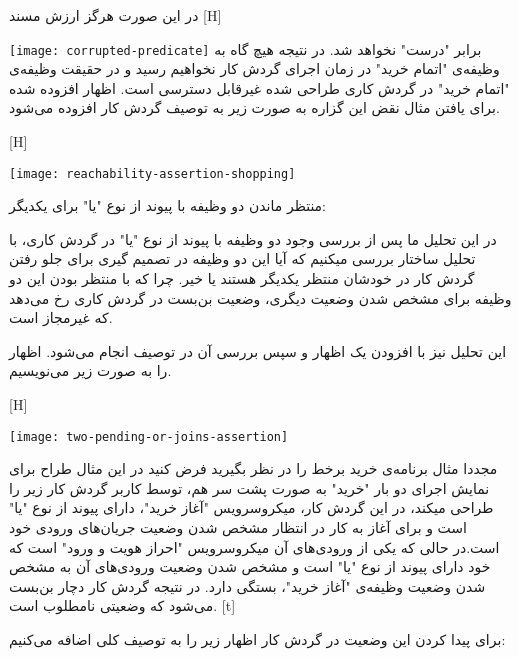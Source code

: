 در این صورت هرگز ارزش مسند 
[H]
\raggedright
\texttt{[image: corrupted-predicate]}
\vspace{0.5em}
برابر "درست" نخواهد شد. در نتیجه هیچ گاه به وظیفه‌ی "اتمام خرید" در زمان اجرای گردش کار نخواهیم رسید و در حقیقت وظیفه‌ی "اتمام خرید" در گردش کاری طراحی شده غیرقابل دسترسی است. اظهار افزوده شده برای یافتن مثال نقض این گزاره به صورت زیر به توصیف گردش کار افزوده می‌شود. 



[H]
\raggedright
\texttt{[image: reachability-assertion-shopping]}
\vspace{0.5em}
 

 منتظر ماندن دو وظیفه با پیوند از نوع "یا" برای یکدیگر:

در این تحلیل ما پس از بررسی وجود دو وظیفه با پیوند از نوع "یا" در گردش کاری، با تحلیل ساختار بررسی میکنیم که آیا این دو وظیفه در تصمیم گیری برای جلو رفتن گردش کار در خودشان منتظر یکدیگر هستند یا خیر. چرا که با منتظر بودن این دو وظیفه برای مشخص شدن وضعیت دیگری، وضعیت بن‌بست در گردش کاری رخ می‌دهد که غیرمجاز است.

 این تحلیل نیز با افزودن یک اظهار و سپس بررسی آن در توصیف انجام‌ می‌شود. اظهار را به صورت زیر می‌نویسیم. 
 
 
 
[H]
\raggedright
\texttt{[image: two-pending-or-joins-assertion]}
\vspace{0.5em}


مجددا مثال برنامه‌ی خرید برخط را در نظر بگیرید فرض کنید در این مثال طراح برای نمایش اجرای دو بار "خرید" به صورت پشت سر هم، توسط کاربر گردش کار زیر را طراحی میکند، در این گردش کار، میکروسرویس "آغاز خرید"، دارای پیوند از نوع "یا" است و برای آغاز به کار در انتظار مشخص شدن وضعیت جریان‌های ورودی خود است.در حالی که یکی از ورودی‌های آن میکروسرویس "احراز هویت و ورود" است که خود دارای پیوند از نوع "یا" است و مشخص شدن وضعیت ورودی‌های آن به مشخص شدن وضعیت وظیفه‌ی "آغاز خرید"، بستگی دارد. در نتیجه گردش کار دچار بن‌بست می‌شود که وضعیتی نامطلوب است.
[t]
\raggedright
{}
\vspace{0.5em}

برای پیدا کردن این وضعیت در گردش کار اظهار زیر را به توصیف کلی اضافه می‌کنیم:



